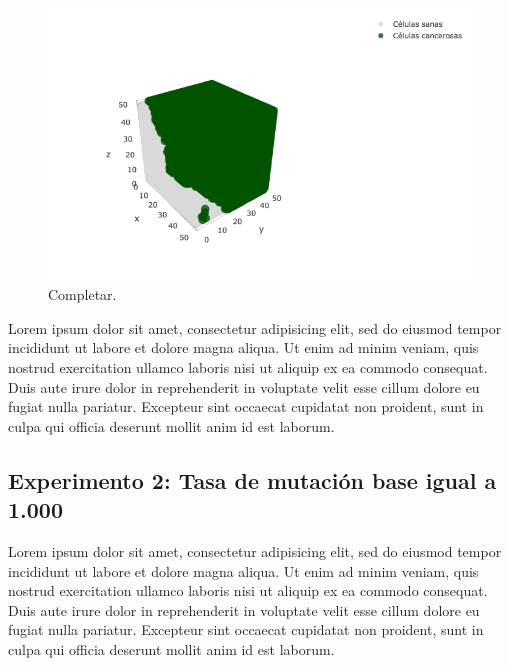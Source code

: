 \begin{figure}[h]
\centering
\includegraphics[scale=0.6]{figures/experiments/exp1/grid}
\caption{Completar.}
\end{figure}

Lorem ipsum dolor sit amet, consectetur adipisicing elit, sed do eiusmod tempor incididunt ut labore et dolore magna aliqua.
Ut enim ad minim veniam, quis nostrud exercitation ullamco laboris nisi ut aliquip ex ea commodo consequat.
Duis aute irure dolor in reprehenderit in voluptate velit esse cillum dolore eu fugiat nulla pariatur.
Excepteur sint occaecat cupidatat non proident, sunt in culpa qui officia deserunt mollit anim id est laborum.

\subsection{Experimento 2: Tasa de mutación base igual a 1.000}

Lorem ipsum dolor sit amet, consectetur adipisicing elit, sed do eiusmod tempor incididunt ut labore et dolore magna aliqua.
Ut enim ad minim veniam, quis nostrud exercitation ullamco laboris nisi ut aliquip ex ea commodo consequat.
Duis aute irure dolor in reprehenderit in voluptate velit esse cillum dolore eu fugiat nulla pariatur.
Excepteur sint occaecat cupidatat non proident, sunt in culpa qui officia deserunt mollit anim id est laborum.

